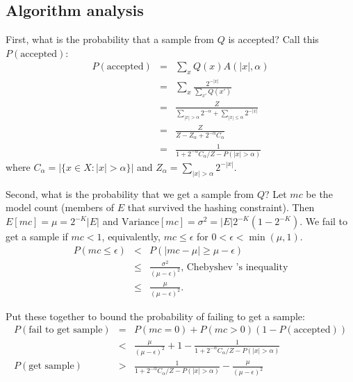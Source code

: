 \documentclass{article}
\begin{document}
\subsection{Algorithm analysis}
First, what is the probability that a sample from $Q$ is accepted?
Call this $P(\text{accepted})$:
\begin{eqnarray}
  P(\text{accepted}) &=& \sum_x Q(x)A(|x|,\alpha)\\
  & = &\sum_x \frac{2^{-|x|}}{\sum_{x'}Q(x')}\\
  & = &\frac{Z}{\sum_{|x|>\alpha}2^{-\alpha} + \sum_{|x|\leq\alpha}2^{-|x|}}\\
  & = &\frac{Z}{Z - Z_\alpha + 2^{-\alpha}C_\alpha}\\
  & = &\frac{1}{1 + 2^{-\alpha}C_\alpha/Z - P(|x|>\alpha)}
\end{eqnarray}
where $C_\alpha = |\{x\in X : |x|>\alpha\}|$ and $Z_\alpha = \sum_{|x|>\alpha}2^{-|x|} $.

Second, what is the probability that we get a sample from $Q$?
Let $mc$ be the model count (members of $E$ that survived the hashing constraint).
Then $E[mc] = \mu = 2^{-K}|E|$ and $\text{Variance}[mc] = \sigma^2 = |E|2^{-K}(1 - 2^{-K})$.
We fail to get a sample if $mc<1$, equivalently, $mc\leq \epsilon$ for $0<\epsilon < \min (\mu,1)$.
\begin{eqnarray}
  P(mc\leq \epsilon)&<& P(|mc-\mu |\geq \mu -  \epsilon)\\
  &\leq&\frac{\sigma^2}{(\mu - \epsilon)^2}\text{, Chebyshev 's inequality}\\
  &\leq&\frac{\mu}{(\mu - \epsilon)^2}.
\end{eqnarray}

Put these together to bound the probability of failing to get a sample:
\begin{eqnarray}
  P(\text{fail to get sample})& = &P(mc = 0) + P(mc > 0)(1 - P(\text{accepted}))\\
  &<&\frac{\mu}{(\mu - \epsilon)^2} + 1 - \frac{1}{1 + 2^{-\alpha}C_\alpha/Z - P(|x|>\alpha)}\\
  P(\text{get sample})&>& \frac{1}{1 + 2^{-\alpha}C_\alpha/Z - P(|x|>\alpha)} - \frac{\mu}{(\mu - \epsilon)^2}\\
\end{eqnarray}
\end{document}
